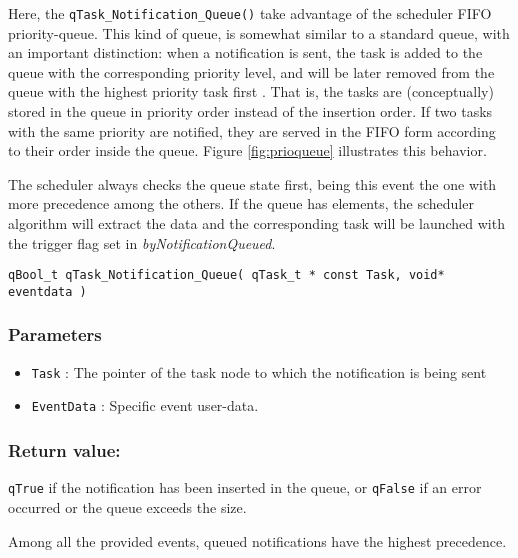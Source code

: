 Here, the \lstinline{qTask_Notification_Queue()}  take advantage of the scheduler FIFO priority-queue. 
This kind of queue, is somewhat similar to a standard queue, with an important distinction: when a notification is sent, the task is added to the queue with the corresponding priority level, and will be later removed from the queue with the highest priority task first  \cite{cormen}. That is, the tasks are (conceptually) stored in the queue in priority order instead of the insertion order. If two tasks with the same priority are notified, they are served in the FIFO form according to their order inside the queue. Figure \ref{fig:prioqueue} illustrates this behavior.



The scheduler always checks the queue state first, being this event the one with more precedence among the others. If the queue has elements, the scheduler algorithm will extract the data and the corresponding task will be launched with the trigger flag set in \textit{byNotificationQueued}. 
\medskip

\begin{lstlisting}[style=CStyle]
qBool_t qTask_Notification_Queue( qTask_t * const Task, void* eventdata )
\end{lstlisting}

\subsubsection*{Parameters}
\begin{itemize}
    \item \lstinline{Task} : The pointer of the task node to which the notification is being sent 
    \item \lstinline{EventData} : Specific event user-data. 
\end{itemize}

\subsubsection*{Return value:}

\lstinline{qTrue} if the notification  has been inserted in the queue, or \lstinline{qFalse} if an error occurred or the queue exceeds the size. 
\medskip
\begin{tcolorbox}
\HandRight Among all the provided events, queued notifications have the highest precedence.
\end{tcolorbox}


